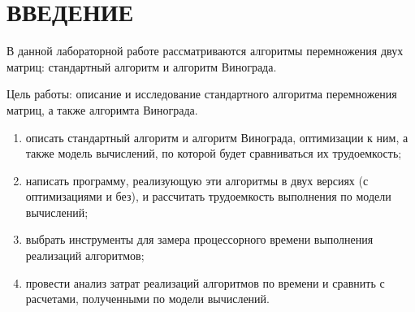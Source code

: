 \chapter*{ВВЕДЕНИЕ}

В данной лабораторной работе рассматриваются алгоритмы перемножения двух матриц: стандартный алгоритм и алгоритм Винограда.

Цель работы: описание и исследование стандартного алгоритма перемножения матриц, а также алгоримта Винограда.

\begin{enumerate}[label={\arabic*)}]
	\item описать стандартный алгоритм и алгоритм Винограда, оптимизации к ним, а также модель вычислений, по которой будет сравниваться их трудоемкость;
	\item написать программу, реализующую эти алгоритмы в двух версиях (с оптимизациями и без), и рассчитать трудоемкость выполнения по модели вычислений;
	\item выбрать инструменты для замера процессорного времени выполнения реализаций алгоритмов;
	\item провести анализ затрат реализаций алгоритмов по времени и сравнить с расчетами, полученными по модели вычислений.
\end{enumerate}